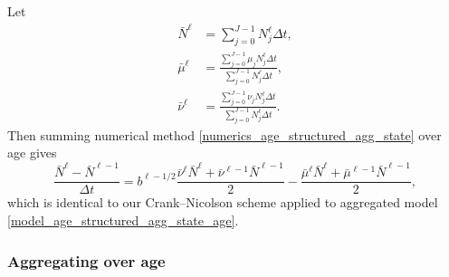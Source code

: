 \documentclass[USenglish]{article}
\begin{document}
Let
\begin{subequations}
  \begin{align}
    \bar{N}^{\ell}
    &= \sum_{j = 0}^{J - 1} N_j^{\ell} \Delta t,
    \\
    \bar{\mu}^{\ell}
    &= \frac{\sum_{j = 0}^{J - 1} \mu_j N_j^{\ell} \Delta t}
    {\sum_{j = 0}^{J - 1} N_j^{\ell} \Delta t},
    \\
    \bar{\nu}^{\ell}
    &= \frac{\sum_{j = 0}^{J - 1} \nu_j N_j^{\ell} \Delta t}
    {\sum_{j = 0}^{J - 1} N_j^{\ell} \Delta t}.
  \end{align}
\end{subequations}
Then summing numerical method
\eqref{numerics_age_structured_agg_state} over age gives
\begin{equation}
  \label{numerics_age_structured_agg_state_age}
  \frac{\bar{N}^{\ell} - \bar{N}^{\ell - 1}}{\Delta t}
  = b^{\ell - 1 / 2}
  \frac{\bar{\nu}^{\ell} \bar{N}^{\ell}
    + \bar{\nu}^{\ell - 1} \bar{N}^{\ell - 1}}{2}
  - \frac{\bar{\mu}^{\ell} \bar{N}^{\ell}
    + \bar{\mu}^{\ell - 1} \bar{N}^{\ell - 1}}{2},
\end{equation}
which is identical to our Crank--Nicolson scheme applied to aggregated
model \eqref{model_age_structured_agg_state_age}.


\subsubsection{Aggregating over age}
\end{document}
